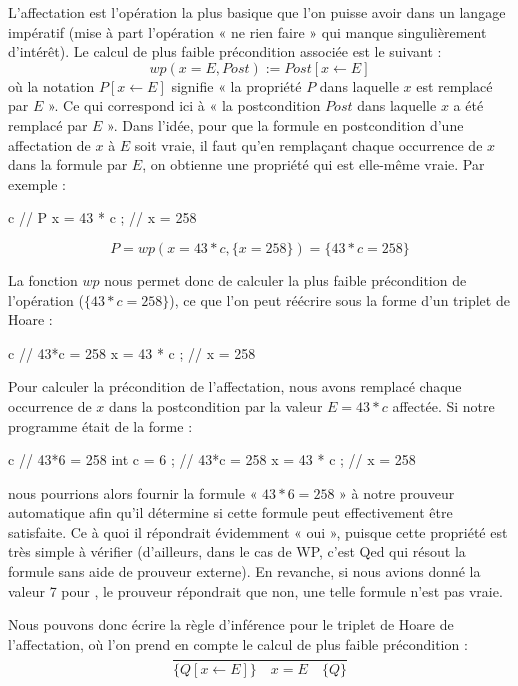 

L'affectation est l'opération la plus basique que l'on puisse avoir dans un
langage impératif (mise à part l'opération « ne rien faire » qui manque singulièrement
d'intérêt). Le calcul de plus faible précondition associée est le suivant :
$$wp(x = E , Post) := Post[x \leftarrow E]$$
où la notation $P[x \leftarrow E]$ signifie « la propriété $P$ dans laquelle $x$
est remplacé par $E$ ». Ce qui correspond ici à « la postcondition $Post$ dans
laquelle $x$ a été
remplacé par $E$ ». Dans l'idée, pour que la formule en postcondition d'une
affectation de $x$ à $E$ soit vraie, il faut qu'en remplaçant chaque occurrence de
$x$ dans la formule par $E$, on obtienne une propriété qui est elle-même vraie.
Par exemple :

\begin{CodeBlock}{c}
// { P }
x = 43 * c ;
// { x = 258 }
\end{CodeBlock}

$$P = wp(x = 43*c , \{x = 258\}) = \{43*c = 258\}$$


La fonction $wp$ nous permet donc de calculer la plus faible précondition de
l'opération ($\{43*c = 258\}$), ce que l'on peut réécrire sous la forme d'un
triplet de Hoare :



\begin{CodeBlock}{c}
// { 43*c = 258 }
x = 43 * c ;
// { x = 258 }
\end{CodeBlock}



Pour calculer la précondition de l'affectation, nous avons remplacé chaque
occurrence de $x$ dans la postcondition par la valeur $E = 43*c$ affectée.
Si notre programme était de la forme :
\begin{CodeBlock}{c}
// { 43*6 = 258 }
int c = 6 ;
// { 43*c = 258 }
x = 43 * c ;
// { x = 258 }
\end{CodeBlock}
nous pourrions alors fournir la formule « $43*6 = 258$ » à notre prouveur automatique
afin qu'il détermine si cette formule peut effectivement être satisfaite. Ce à quoi
il répondrait évidemment « oui », puisque cette propriété est très simple à vérifier
(d'ailleurs, dans le cas de WP, c'est Qed qui résout la formule sans aide de prouveur
externe). En revanche, si nous avions donné la valeur 7 pour , le
prouveur répondrait que non, une telle formule n'est pas vraie.



Nous pouvons donc écrire la règle d'inférence pour le triplet de Hoare de
l'affectation, où l'on prend en compte le calcul de plus faible précondition :
$$\dfrac{}{\{Q[x \leftarrow E] \}\quad x = E \quad\{ Q \}}$$


